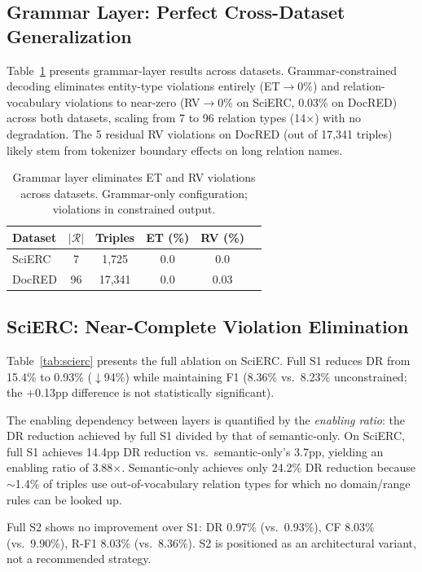 \documentclass[11pt,a4paper]{article}
\begin{document}
\subsection{Grammar Layer: Perfect Cross-Dataset Generalization}

Table~\ref{tab:grammar} presents grammar-layer results across datasets.
Grammar-constrained decoding eliminates entity-type violations entirely (ET$\to$0\%) and relation-vocabulary violations to near-zero (RV$\to$0\% on SciERC, 0.03\% on DocRED) across both datasets, scaling from 7 to 96 relation types (14$\times$) with no degradation.
The 5 residual RV violations on DocRED (out of 17,341 triples) likely stem from tokenizer boundary effects on long relation names.

\begin{table}[t]
\centering
\small
\caption{Grammar layer eliminates ET and RV violations across datasets. Grammar-only configuration; violations in constrained output.}
\label{tab:grammar}
\begin{tabular}{lccccc}
\toprule
\textbf{Dataset} & $|\mathcal{R}|$ & \textbf{Triples} & \textbf{ET (\%)} & \textbf{RV (\%)} \\
\midrule
SciERC  & 7  & 1,725  & 0.0 & 0.0 \\
DocRED  & 96 & 17,341 & 0.0 & 0.03 \\
\bottomrule
\end{tabular}
\end{table}

\subsection{SciERC: Near-Complete Violation Elimination}

Table~\ref{tab:scierc} presents the full ablation on SciERC.
Full S1 reduces DR from 15.4\% to 0.93\% ($\downarrow$94\%) while maintaining F1 (8.36\% vs.\ 8.23\% unconstrained; the +0.13pp difference is not statistically significant).

The enabling dependency between layers is quantified by the \emph{enabling ratio}: the DR reduction achieved by full S1 divided by that of semantic-only.
On SciERC, full S1 achieves 14.4pp DR reduction vs.\ semantic-only's 3.7pp, yielding an enabling ratio of 3.88$\times$.
Semantic-only achieves only 24.2\% DR reduction because $\sim$1.4\% of triples use out-of-vocabulary relation types for which no domain/range rules can be looked up.

Full S2 shows no improvement over S1: DR 0.97\% (vs.\ 0.93\%), CF 8.03\% (vs.\ 9.90\%), R-F1 8.03\% (vs.\ 8.36\%).
S2 is positioned as an architectural variant, not a recommended strategy.
\end{document}
